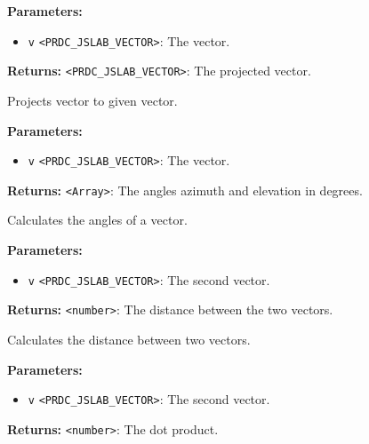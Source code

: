\documentclass[12pt,a4paper]{article}
\begin{document}
\noindent \textbf{Parameters:}
\begin{itemize}
  \item \texttt{v} \texttt{<PRDC\_JSLAB\_VECTOR>}: The vector.
\end{itemize}

\noindent \textbf{Returns:} \texttt{<PRDC\_JSLAB\_VECTOR>}: The projected vector.

\noindent Projects vector to given vector.

\vspace{5mm}
\noindent {}


\noindent \textbf{Parameters:}
\begin{itemize}
  \item \texttt{v} \texttt{<PRDC\_JSLAB\_VECTOR>}: The vector.
\end{itemize}

\noindent \textbf{Returns:} \texttt{<Array>}: The angles azimuth and elevation in degrees.

\noindent Calculates the angles of a vector.

\vspace{5mm}
\noindent {}


\noindent \textbf{Parameters:}
\begin{itemize}
  \item \texttt{v} \texttt{<PRDC\_JSLAB\_VECTOR>}: The second vector.
\end{itemize}

\noindent \textbf{Returns:} \texttt{<number>}: The distance between the two vectors.

\noindent Calculates the distance between two vectors.

\vspace{5mm}
\noindent {}


\noindent \textbf{Parameters:}
\begin{itemize}
  \item \texttt{v} \texttt{<PRDC\_JSLAB\_VECTOR>}: The second vector.
\end{itemize}

\noindent \textbf{Returns:} \texttt{<number>}: The dot product.
\end{document}
